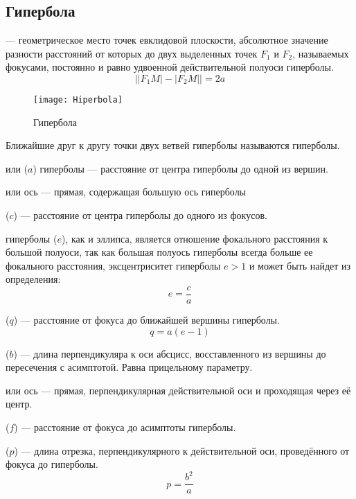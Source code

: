 \subsection{Гипербола}
 
{\bfseries {}} --- геометрическое место точек евклидовой плоскости, абсолютное значение разности расстояний от которых до двух выделенных точек $F_1$ и $F_2$, называемых фокусами, постоянно и равно удвоенной действительной полуоси гиперболы.
\begin{equation}
\bigl||F_1M|-|F_2M|\bigr|=2a
\end{equation}
\begin{figure}[h!]
\centering
\texttt{[image: Hiperbola]}
\caption{Гипербола \label{pic:the-pic}}
\end{figure}

Ближайшие друг к другу точки двух ветвей гиперболы называются  гиперболы.

 или  ($a$) гиперболы --- расстояние от центра гиперболы до одной из вершин.

 или  ось ---  прямая, содержащая большую ось гиперболы

 ($c$) ---  расстояние от центра гиперболы до одного из фокусов.

 гиперболы ($e$), как и  эллипса, является отношение фокального расстояния к большой полуоси, так как большая полуось гиперболы всегда больше ее фокального расстояния, эксцентриситет гиперболы $e > 1$ и может быть найдет из определения:\begin{equation}
e=\frac{c}{a}
\end{equation}

 ($q$) --- расстояние от фокуса до ближайшей вершины гиперболы.\begin{equation}
q=a(e-1)
\end{equation}

 ($b$) --- длина перпендикуляра к оси абсцисс, восставленного из вершины до пересечения с асимптотой. Равна прицельному параметру.

 или  ось --- прямая, перпендикулярная действительной оси и проходящая через её центр.

 ($f$) --- расстояние от фокуса до асимптоты гиперболы.

 ($p$) --- длина отрезка, перпендикулярного к действительной оси, проведённого от фокуса до гиперболы.
\begin{equation}
p=\frac{b^2}{a}
\end{equation}

